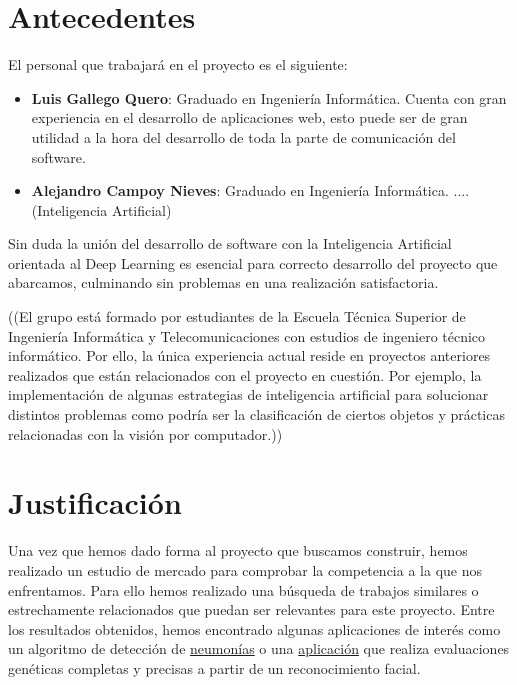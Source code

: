 \documentclass[a4paper,12pt,oneside]{article}
\begin{document}
\section{Antecedentes}

El personal que trabajará en el proyecto es el siguiente:
\begin{itemize}
	\item \textbf{Luis Gallego Quero}: Graduado en Ingeniería Informática. Cuenta con gran experiencia en el desarrollo de aplicaciones web, esto puede ser de gran utilidad a la hora del desarrollo de toda la parte de comunicación del software.
	\item \textbf{Alejandro Campoy Nieves}:  Graduado en Ingeniería Informática. .... (Inteligencia Artificial)
\end{itemize}

Sin duda la unión del desarrollo de software con la Inteligencia Artificial orientada al Deep Learning es esencial para correcto desarrollo del proyecto que abarcamos, culminando sin problemas en una realización satisfactoria. 

((El grupo está formado por estudiantes de la Escuela Técnica Superior de Ingeniería Informática y Telecomunicaciones con estudios de ingeniero técnico informático. Por ello, la única experiencia actual reside en proyectos anteriores realizados que están relacionados con el proyecto en cuestión. Por ejemplo, la implementación de algunas estrategias de inteligencia artificial para solucionar distintos problemas como podría ser la clasificación de ciertos objetos y prácticas relacionadas con la visión por computador.))

\section{Justificación}

Una vez que hemos dado forma al proyecto que buscamos construir, hemos realizado un estudio de mercado para comprobar la competencia a la que nos enfrentamos. Para ello hemos realizado una búsqueda de trabajos similares o estrechamente relacionados que puedan ser relevantes para este proyecto. Entre los resultados obtenidos, hemos encontrado algunas aplicaciones de interés como un algoritmo de detección de \href{https://blogthinkbig.com/este-algoritmo-diagnostica-neumonia-con-la-precision-de-un-medico}{neumonías} o una \href{https://www.face2gene.com/}{aplicación} que realiza evaluaciones genéticas completas y precisas a partir de un reconocimiento facial. \\
\end{document}
